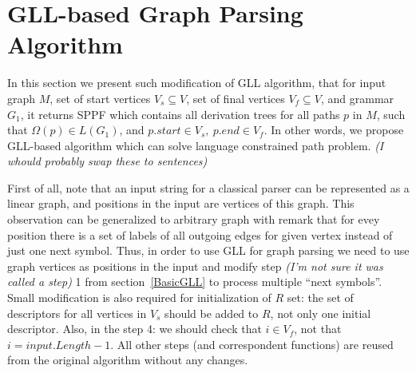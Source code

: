 \section{GLL-based Graph Parsing Algorithm}


In this section we present such modification of GLL algorithm, that for input graph $M$, set of start vertices $V_s\subseteq V$, set of final vertices $V_f\subseteq V$, and grammar $G_1$, it returns SPPF which contains all derivation trees for all paths $p$ in $M$, such that $\Omega(p) \in L(G_1)$, and $p.start \in V_s,\ p.end \in V_f$.
In other words, we propose GLL-based algorithm which can solve language constrained path problem. \emph{(I whould probably swap these to sentences)}

First of all, note that an input string for a classical parser can be represented as a linear graph, and positions in the input are vertices of this graph.
This observation can be generalized to arbitrary graph with remark that for evey position there is a set of labels of all outgoing edges for given vertex instead of just one next symbol. 
Thus, in order to use GLL for graph parsing we need to use graph vertices as positions in the input and modify step \emph{(I'm not sure it was called a step)} 1 from section~\ref{BasicGLL} to process multiple ``next symbols''.
Small modification is also required for initialization of $R$ set: the set of descriptors for all vertices in $V_s$ should be added to $R$, not only one initial descriptor.
Also, in the step 4: we should check that $i \in V_f$, not that $i = input.Length - 1$.
All other steps (and correspondent functions) are reused from the original algorithm without any changes.

